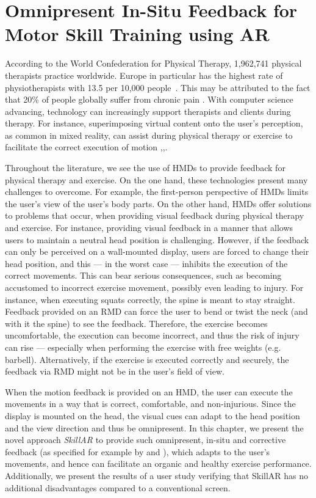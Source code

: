 \chapter{Omnipresent In-Situ Feedback for Motor Skill Training using AR \label{chap:omnipresent}}
According to the World Confederation for Physical Therapy, 1,962,741 physical therapists practice worldwide. Europe in particular has the highest rate of physiotherapists with 13.5 per 10,000 people~\cite{worldphysiotherapy2023global}. This may be attributed to the fact that 20\% of people globally suffer from chronic pain \cite{treede2015classification}. With computer science advancing, technology can increasingly support therapists and clients during therapy. For instance, superimposing virtual content onto the user's perception, as common in mixed reality, can assist during physical therapy or exercise to facilitate the correct execution of motion \cite{brepohl2023virtual},\cite{campo2021immersive},\cite{diller2022vcb}.

Throughout the literature, we see the use of HMDs to provide feedback for physical therapy and exercise. On the one hand, these technologies present many challenges to overcome. For example, the first-person perspective of HMDs limits the user’s view of the user's body parts. On the other hand, HMDs offer solutions to problems that occur, when providing visual feedback during physical therapy and exercise. For instance, providing visual feedback in a manner that allows users to maintain a neutral head position is challenging. However, if the feedback can only be perceived on a wall-mounted display, users are forced to change their head position, and this --- in the worst case --- inhibits the execution of the correct movements. This can bear serious consequences, such as becoming accustomed to incorrect exercise movement, possibly even leading to injury. For instance, when executing squats correctly, the spine is meant to stay straight. Feedback provided on an RMD can force the user to bend or twist the neck (and with it the spine) to see the feedback. Therefore, the exercise becomes uncomfortable, the execution can become incorrect, and thus the risk of injury can rise --- especially when performing the exercise with free weights (e.g. barbell). Alternatively, if the exercise is executed correctly and securely, the feedback via RMD might not be in the user's field of view.

When the motion feedback is provided on an HMD, the user can execute the movements in a way that is correct, comfortable, and non-injurious. Since the display is mounted on the head, the visual cues can adapt to the head position and the view direction and thus be omnipresent. In this chapter, we present the novel approach \emph{SkillAR} to provide such omnipresent, in-situ and corrective feedback (as specified for example by \cite{hattie:2007:Feedback} and \cite{Lysakowski:1982:Feedback}), which adapts to the user's movements, and hence can facilitate an organic and healthy exercise performance. Additionally, we present the results of a user study verifying that SkillAR has no additional disadvantages compared to a conventional screen.

